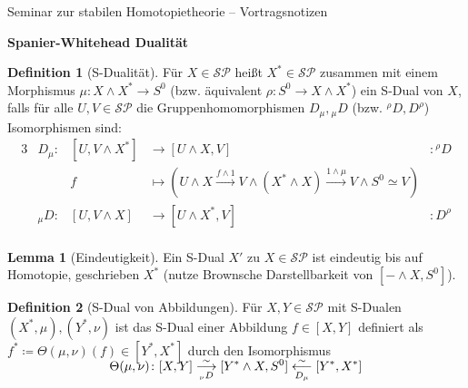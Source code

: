 \documentclass[ngerman, parskip=half]{scrartcl}
\theoremstyle{definition}
\newtheorem*{Def}{Definition}
\newtheorem*{Lem}{Lemma}
\newcommand*{\SP}{\ensuremath{\mathcal{SP}}}
\newcommand*{\Smash}{\ensuremath{\wedge}}
\newcommand*{\SDual}{S-Dual}
\newcommand*{\dual}[1]{\ensuremath{#1^*}}
\newcommand*{\Dd}[1]{\ensuremath{D_{#1}}}
\newcommand*{\dD}[1]{\ensuremath{{}_{#1}D}}
\newcommand*{\uD}[1]{\ensuremath{{}^{#1}\!D}}
\newcommand*{\Du}[1]{\ensuremath{D^{#1}}}
\newcommand*{\Sph}{\ensuremath{S^0}}
\newcommand*{\htpic}{\simeq}
\newcommand*{\longto}{\longrightarrow}
\begin{document}
\clearpairofpagestyles
{}
\cfoot*{\pagemark}

\vspace*{.5eM}
\begin{center}
  Seminar zur stabilen Homotopietheorie – Vortragsnotizen\par
  {\LARGE\bfseries Spanier-Whitehead Dualität}
\end{center}
\bigskip

\begin{Def}[S-Dualität]
  Für $X\in\SP$ heißt $\dual{X}\in\SP$ zusammen mit einem Morphismus
  $\mu\colon X\Smash \dual{X}\to\Sph$ (bzw. äquivalent
  $\rho\colon\Sph\to X\Smash\dual{X}$) ein \SDual{} von $X$, falls für
  alle $U,V\in\SP$ die Gruppenhomomorphismen $\Dd{\mu},\dD{\mu}$
  (bzw. $\uD{\rho},\Du{\rho}$) Isomorphismen sind:
  \begin{alignat*}{3}
    &\Dd{\mu}\colon &[U, V\Smash\dual{X}] &\longto [U\Smash X,V]
    &:\uD{\rho}\\
    && f &\longmapsto
           \left(
           U\Smash X \xrightarrow{f\Smash 1}
           V\Smash(\dual{X}\Smash X) \xrightarrow{1\Smash\mu}
           V\Smash\Sph \htpic V
           \right) \\
    &\dD{\mu}\colon &[U, V\Smash X] &\longto [U\Smash\dual{X},V]
    &:\Du{\rho}\\
  \end{alignat*}  
\end{Def}

\begin{Lem}[Eindeutigkeit]
  Ein \SDual{} $X'$ zu $X\in\SP$ ist eindeutig bis auf Homotopie,
  geschrieben $\dual{X}$
  (nutze Brownsche Darstellbarkeit von $[-\Smash X,\Sph]$).
\end{Lem}

\begin{Def}[\SDual{} von Abbildungen]
  Für $X,Y\in\SP$ mit \SDual{}en $(\dual{X},\mu),(\dual{Y},\nu)$
  ist das \SDual{} einer Abbildung $f\in[X,Y]$ definiert als
  $\dual{f}\coloneqq\Theta(\mu,\nu)(f)\in[\dual{Y},\dual{X}]$ durch
  den Isomorphismus
  \begin{gather*}
    \SwapAboveDisplaySkip
    \Theta(\mu,\nu)\colon
    [X,Y]
    \overset{\sim}{\underset{\dD{\nu}}{\longrightarrow}}
    [\dual{Y}\Smash X, \Sph]
    \overset{\sim}{\underset{\Dd{\mu}}{\longleftarrow}}
    [\dual{Y},\dual{X}]
  \end{gather*}
\end{Def}
\end{document}
